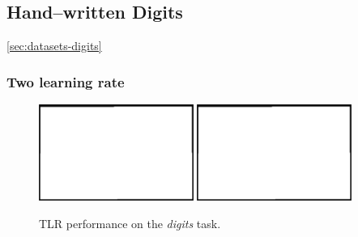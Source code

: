 

\subsection{Hand--written Digits} 
\label{sec:results-digits} 

\ref{sec:datasets-digits} 

\subsubsection{Two learning rate} 
\label{sec:tlr-digits} 

\begin{figure}[H]
  \centering
  \includegraphics[width=0.45\textwidth]{img/placeholder.png}  %
  \includegraphics[width=0.45\textwidth]{img/placeholder.png}  %
  \caption{TLR performance on the \emph{digits} task.}
  \label{fig:results-tlr-digits-success}
\end{figure}

